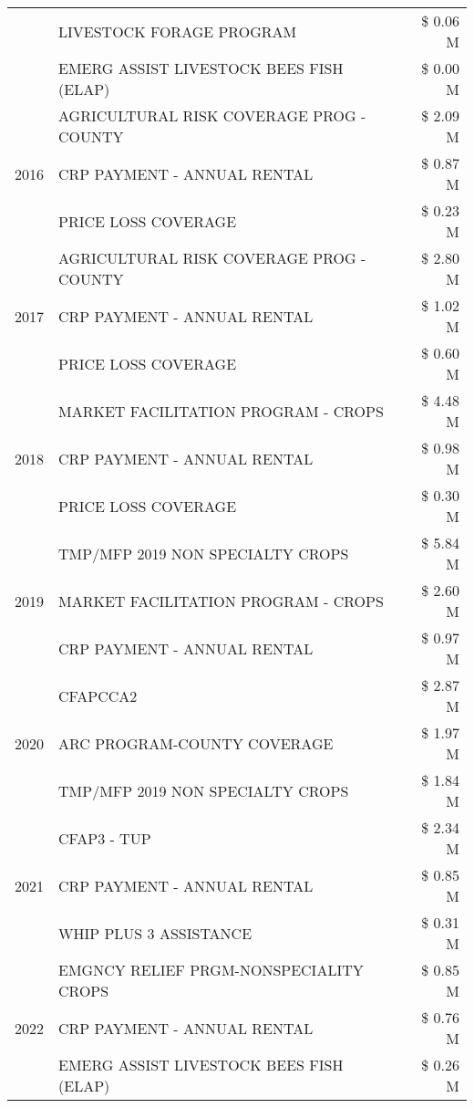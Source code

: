 \begin{tabular}{llr}
 & LIVESTOCK FORAGE PROGRAM & \$ 0.06 M \\
 & EMERG ASSIST LIVESTOCK BEES FISH (ELAP) & \$ 0.00 M \\
\cline{1-3}
\multirow[t]{3}{*}{2016} & AGRICULTURAL RISK COVERAGE PROG - COUNTY & \$ 2.09 M \\
 & CRP PAYMENT - ANNUAL RENTAL & \$ 0.87 M \\
 & PRICE LOSS COVERAGE & \$ 0.23 M \\
\cline{1-3}
\multirow[t]{3}{*}{2017} & AGRICULTURAL RISK COVERAGE PROG - COUNTY & \$ 2.80 M \\
 & CRP PAYMENT - ANNUAL RENTAL & \$ 1.02 M \\
 & PRICE LOSS COVERAGE & \$ 0.60 M \\
\cline{1-3}
\multirow[t]{3}{*}{2018} & MARKET FACILITATION PROGRAM - CROPS & \$ 4.48 M \\
 & CRP PAYMENT - ANNUAL RENTAL & \$ 0.98 M \\
 & PRICE LOSS COVERAGE & \$ 0.30 M \\
\cline{1-3}
\multirow[t]{3}{*}{2019} & TMP/MFP 2019 NON SPECIALTY CROPS & \$ 5.84 M \\
 & MARKET FACILITATION PROGRAM - CROPS & \$ 2.60 M \\
 & CRP PAYMENT - ANNUAL RENTAL & \$ 0.97 M \\
\cline{1-3}
\multirow[t]{3}{*}{2020} & CFAPCCA2 & \$ 2.87 M \\
 & ARC PROGRAM-COUNTY COVERAGE & \$ 1.97 M \\
 & TMP/MFP 2019 NON SPECIALTY CROPS & \$ 1.84 M \\
\cline{1-3}
\multirow[t]{3}{*}{2021} & CFAP3 - TUP & \$ 2.34 M \\
 & CRP PAYMENT - ANNUAL RENTAL & \$ 0.85 M \\
 & WHIP PLUS 3 ASSISTANCE & \$ 0.31 M \\
\cline{1-3}
\multirow[t]{3}{*}{2022} & EMGNCY RELIEF PRGM-NONSPECIALITY CROPS & \$ 0.85 M \\
 & CRP PAYMENT - ANNUAL RENTAL & \$ 0.76 M \\
 & EMERG ASSIST LIVESTOCK BEES FISH (ELAP) & \$ 0.26 M \\
\cline{1-3}
\bottomrule
\end{tabular}
